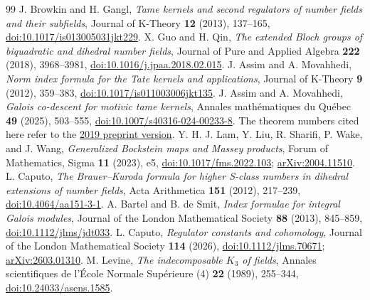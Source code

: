 \documentclass[11pt]{article}
\theoremstyle{remark}\newtheorem{remark}[theorem]{Remark}
\begin{document}
\begin{thebibliography}{99}
 J. Browkin and H. Gangl,
\emph{Tame kernels and second regulators of number fields and their subfields},
Journal of K-Theory \textbf{12} (2013), 137--165,
\href{https://doi.org/10.1017/is013005031jkt229}{doi:10.1017/is013005031jkt229}.
 X. Guo and H. Qin,
\emph{The extended Bloch groups of biquadratic and dihedral number fields},
Journal of Pure and Applied Algebra \textbf{222} (2018), 3968--3981,
\href{https://doi.org/10.1016/j.jpaa.2018.02.015}{doi:10.1016/j.jpaa.2018.02.015}.
 J. Assim and A. Movahhedi,
\emph{Norm index formula for the Tate kernels and applications},
Journal of K-Theory \textbf{9} (2012), 359--383,
\href{https://doi.org/10.1017/is011003006jkt135}{doi:10.1017/is011003006jkt135}.
 J. Assim and A. Movahhedi,
\emph{Galois co-descent for motivic tame kernels},
Annales math\'ematiques du Qu\'ebec \textbf{49} (2025), 503--555,
\href{https://doi.org/10.1007/s40316-024-00233-8}{doi:10.1007/s40316-024-00233-8}.
The theorem numbers cited here refer to the
\href{https://arxiv.org/abs/1901.07219}{2019 preprint version}.
 Y. H. J. Lam, Y. Liu, R. Sharifi, P. Wake, and J. Wang,
\emph{Generalized Bockstein maps and Massey products},
Forum of Mathematics, Sigma \textbf{11} (2023), e5,
\href{https://doi.org/10.1017/fms.2022.103}{doi:10.1017/fms.2022.103};
\href{https://arxiv.org/abs/2004.11510}{arXiv:2004.11510}.
 L. Caputo,
\emph{The Brauer--Kuroda formula for higher S-class numbers in dihedral
extensions of number fields}, Acta Arithmetica \textbf{151} (2012), 217--239,
\href{https://doi.org/10.4064/aa151-3-1}{doi:10.4064/aa151-3-1}.
 A. Bartel and B. de Smit,
\emph{Index formulae for integral Galois modules},
Journal of the London Mathematical Society \textbf{88} (2013), 845--859,
\href{https://doi.org/10.1112/jlms/jdt033}{doi:10.1112/jlms/jdt033}.
 L. Caputo, \emph{Regulator constants and cohomology},
Journal of the London Mathematical Society \textbf{114} (2026),
\href{https://doi.org/10.1112/jlms.70671}{doi:10.1112/jlms.70671};
\href{https://arxiv.org/abs/2603.01310}{arXiv:2603.01310}.
 M. Levine,
\emph{The indecomposable \(K_3\) of fields},
Annales scientifiques de l'\'Ecole Normale Sup\'erieure (4)
\textbf{22} (1989), 255--344,
\href{https://doi.org/10.24033/asens.1585}{doi:10.24033/asens.1585}.
\end{thebibliography}
\end{document}
